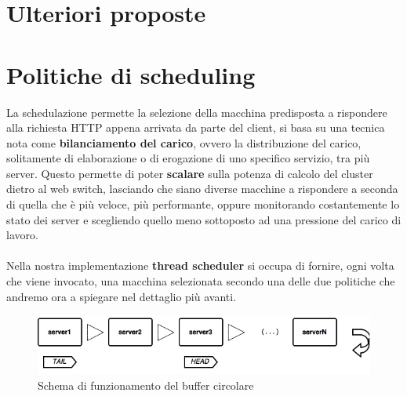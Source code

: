 \documentclass[italian]{tktltiki2}
\begin{document}
\newpage
\section{Ulteriori proposte}

\newpage
\section{Politiche di scheduling}
La schedulazione permette la selezione della macchina predisposta a rispondere alla richiesta HTTP appena arrivata da parte del client, si basa su una tecnica nota come \textbf{bilanciamento del carico}, ovvero la distribuzione del carico, solitamente di elaborazione o di erogazione di uno specifico servizio, tra più server. Questo permette di poter \textbf{scalare} sulla potenza di calcolo del cluster dietro al web switch, lasciando che siano diverse macchine a rispondere a seconda di quella che è più veloce, più performante, oppure monitorando costantemente lo stato dei server e scegliendo quello meno sottoposto ad una pressione del carico di lavoro. \\ \\ 
Nella nostra implementazione \textbf{thread scheduler} si occupa di fornire,  ogni volta che viene invocato, una macchina selezionata secondo una delle due politiche che andremo ora a spiegare nel dettaglio più avanti.


\begin{figure}[b]
\centering
\includegraphics[width=\textwidth]{images/rrobin_stateless}
\caption{Schema di funzionamento del buffer circolare \label{fig: rrobin_sl}}
\end{figure}
\end{document}

